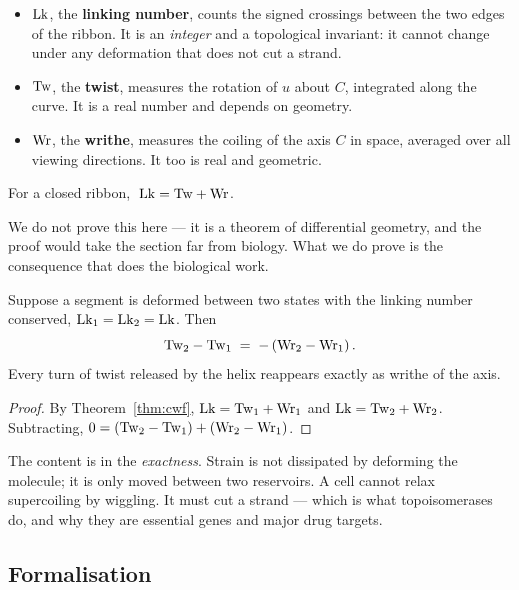 \begin{definition}\label{def:lktwwr}
\begin{itemize}[leftmargin=*,itemsep=1pt,topsep=1pt]
  \item $\mathrm{Lk}$, the \textbf{linking number}, counts the signed crossings between
        the two edges of the ribbon. It is an \emph{integer} and a topological
        invariant: it cannot change under any deformation that does not cut a strand.
  \item $\mathrm{Tw}$, the \textbf{twist}, measures the rotation of $u$ about $C$,
        integrated along the curve. It is a real number and depends on geometry.
  \item $\mathrm{Wr}$, the \textbf{writhe}, measures the coiling of the axis $C$ in space,
        averaged over all viewing directions. It too is real and geometric.
\end{itemize}
\end{definition}

\begin{theorem}\label{thm:cwf}
For a closed ribbon, $\;\mathrm{Lk} = \mathrm{Tw} + \mathrm{Wr}$.
\end{theorem}

We do not prove this here --- it is a theorem of differential geometry, and the
proof would take the section far from biology. What we do prove is the
consequence that does the biological work.

\begin{theorem}\label{thm:trade}
Suppose a segment is deformed between two states with the linking number
conserved, $\mathrm{Lk}_1 = \mathrm{Lk}_2 = \mathrm{Lk}$. Then
\[
  \mathrm{Tw}_2 - \mathrm{Tw}_1 \;=\; -\left(\mathrm{Wr}_2 - \mathrm{Wr}_1\right).
\]
Every turn of twist released by the helix reappears exactly as writhe of the axis.
\end{theorem}

\begin{proof}
By Theorem~\ref{thm:cwf}, $\mathrm{Lk} = \mathrm{Tw}_1 + \mathrm{Wr}_1$ and $\mathrm{Lk} = \mathrm{Tw}_2 + \mathrm{Wr}_2$.
Subtracting, $0 = (\mathrm{Tw}_2 - \mathrm{Tw}_1) + (\mathrm{Wr}_2 - \mathrm{Wr}_1)$.
\end{proof}

The content is in the \emph{exactness}. Strain is not dissipated by deforming the
molecule; it is only moved between two reservoirs. A cell cannot relax
supercoiling by wiggling. It must cut a strand --- which is what topoisomerases
do, and why they are essential genes and major drug targets.

\subsection{Formalisation}

